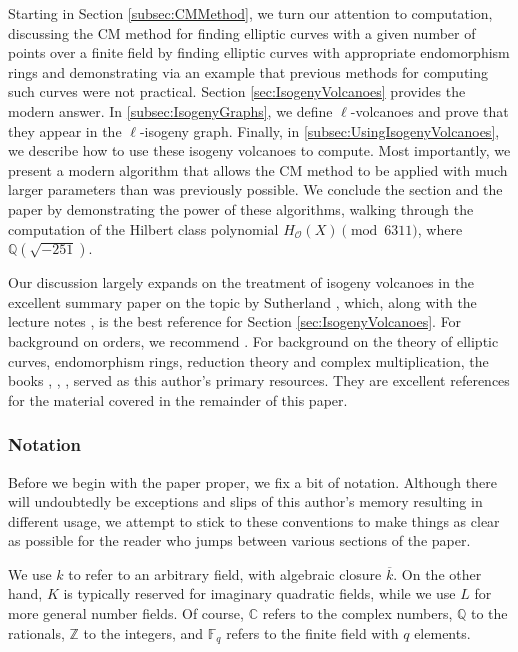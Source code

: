 \documentclass{amsart}
\theoremstyle{definition}
\theoremstyle{remark}
\numberwithin{equation}{section}
\newcommand{\cO}{\mathcal O}
\newcommand{\bbC}{\mathbb C}
\newcommand{\bbF}{\mathbb F}
\newcommand{\bbQ}{\mathbb Q}
\newcommand{\bbZ}{\mathbb Z}
\begin{document}
 Starting in Section \ref{subsec:CMMethod}, we turn our attention to computation, discussing the CM method for finding elliptic curves with a given number of points over a finite field by finding elliptic curves with appropriate endomorphism rings and demonstrating via an example that previous methods for computing such curves were not practical. Section \ref{sec:IsogenyVolcanoes} provides the modern answer. In \ref{subsec:IsogenyGraphs}, we define $\ell$-volcanoes and prove that they appear in the $\ell$-isogeny graph. Finally, in \ref{subsec:UsingIsogenyVolcanoes}, we describe how to use these isogeny volcanoes to compute. Most importantly, we present a modern algorithm that allows the CM method to be applied with much larger parameters than was previously possible. We conclude the section and the paper by demonstrating the power of these algorithms, walking through the computation of the Hilbert class polynomial $H_{\cO}(X) \pmod{6311}$, where $\bbQ(\sqrt{-251})$.
 
 Our discussion largely expands on the treatment of isogeny volcanoes in the excellent summary paper on the topic by Sutherland \cite{SutherlandIV}, which, along with the lecture notes \cite{SutherlandLN}, is the best reference for Section \ref{sec:IsogenyVolcanoes}. For background on orders, we recommend \cite{OssermanOrders}. For background on the theory of elliptic curves, endomorphism rings, reduction theory and complex multiplication, the books \cite{CoxPrimes}, \cite{LangEF}, \cite{SilvermanAEC}, \cite{SilvermanATAEC} served as this author's primary resources. They are excellent references for the material covered in the remainder of this paper.
 
 \subsubsection{Notation}
 Before we begin with the paper proper, we fix a bit of notation. Although there will undoubtedly be exceptions and slips of this author's memory resulting in different usage, we attempt to stick to these conventions to make things as clear as possible for the reader who jumps between various sections of the paper.
 
 We use $k$ to refer to an arbitrary field, with algebraic closure $\overline{k}$. On the other hand, $K$ is typically reserved for imaginary quadratic fields, while we use $L$ for more general number fields. Of course, $\bbC$ refers to the complex numbers, $\bbQ$ to the rationals, $\bbZ$ to the integers, and $\bbF_{q}$ refers to the finite field with $q$ elements.
 
\end{document}
